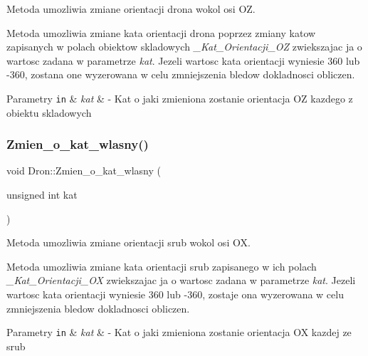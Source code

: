 Metoda umozliwia zmiane orientacji drona wokol osi OZ. 

Metoda umozliwia zmiane kata orientacji drona poprzez zmiany katow zapisanych w polach obiektow skladowych {\itshape \+\_\+\+Kat\+\_\+\+Orientacji\+\_\+\+OZ} zwiekszajac ja o wartosc zadana w parametrze {\itshape kat}. Jezeli wartosc kata orientacji wyniesie 360 lub -\/360, zostana one wyzerowana w celu zmniejszenia bledow dokladnosci obliczen.


\begin{DoxyParams}[1]{Parametry}
\mbox{\tt in}  & {\em kat} & -\/ Kat o jaki zmieniona zostanie orientacja OZ kazdego z obiektu skladowych \\
\hline
\end{DoxyParams}
\mbox{\label{classDron_a6fcd15ec24881f0e92e84fc04ddd9a9a}} 
\subsubsection{\texorpdfstring{Zmien\+\_\+o\+\_\+kat\+\_\+wlasny()}{Zmien\_o\_kat\_wlasny()}}
{\footnotesize\ttfamily void Dron\+::\+Zmien\+\_\+o\+\_\+kat\+\_\+wlasny (\begin{DoxyParamCaption}\item[{unsigned int}]{kat }\end{DoxyParamCaption})}



Metoda umozliwia zmiane orientacji srub wokol osi OX. 

Metoda umozliwia zmiane kata orientacji srub zapisanego w ich polach {\itshape \+\_\+\+Kat\+\_\+\+Orientacji\+\_\+\+OX} zwiekszajac ja o wartosc zadana w parametrze {\itshape kat}. Jezeli wartosc kata orientacji wyniesie 360 lub -\/360, zostaje ona wyzerowana w celu zmniejszenia bledow dokladnosci obliczen.


\begin{DoxyParams}[1]{Parametry}
\mbox{\tt in}  & {\em kat} & -\/ Kat o jaki zmieniona zostanie orientacja OX kazdej ze srub \\
\hline
\end{DoxyParams}
\mbox{\label{classDron_a5f5867d7f7adb7e540ef762a782a4103}} 

